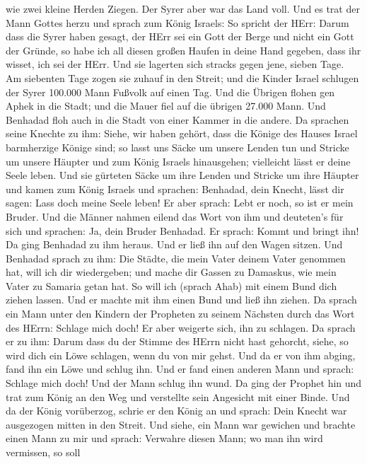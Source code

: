 wie zwei kleine Herden Ziegen. Der Syrer aber war das Land voll.
 Und es trat der Mann Gottes herzu und sprach zum König
Israels: So spricht der HErr: Darum dass die Syrer haben gesagt, der
HErr sei ein Gott der Berge und nicht ein Gott der Gründe, so habe ich
all diesen großen Haufen in deine Hand gegeben, dass ihr wisset, ich sei
der HErr.  Und sie lagerten sich stracks gegen jene, sieben
Tage. Am siebenten Tage zogen sie zuhauf in den Streit; und die Kinder
Israel schlugen der Syrer 100.000 Mann Fußvolk auf einen Tag.
 Und die Übrigen flohen gen Aphek in die Stadt; und die
Mauer fiel auf die übrigen 27.000 Mann. Und Benhadad floh auch in die
Stadt von einer Kammer in die andere.  Da sprachen seine
Knechte zu ihm: Siehe, wir haben gehört, dass die Könige des Hauses
Israel barmherzige Könige sind; so lasst uns Säcke um unsere Lenden tun
und Stricke um unsere Häupter und zum König Israels hinausgehen;
vielleicht lässt er deine Seele leben.  Und sie gürteten
Säcke um ihre Lenden und Stricke um ihre Häupter und kamen zum König
Israels und sprachen: Benhadad, dein Knecht, lässt dir sagen: Lass doch
meine Seele leben! Er aber sprach: Lebt er noch, so ist er mein Bruder.
 Und die Männer nahmen eilend das Wort von ihm und
deuteten's für sich und sprachen: Ja, dein Bruder Benhadad. Er sprach:
Kommt und bringt ihn! Da ging Benhadad zu ihm heraus. Und er ließ ihn
auf den Wagen sitzen.  Und Benhadad sprach zu ihm: Die
Städte, die mein Vater deinem Vater genommen hat, will ich dir
wiedergeben; und mache dir Gassen zu Damaskus, wie mein Vater zu Samaria
getan hat. So will ich (sprach Ahab) mit einem Bund dich ziehen lassen.
Und er machte mit ihm einen Bund und ließ ihn ziehen.  Da
sprach ein Mann unter den Kindern der Propheten zu seinem Nächsten durch
das Wort des HErrn: Schlage mich doch! Er aber weigerte sich, ihn zu
schlagen.  Da sprach er zu ihm: Darum dass du der Stimme
des HErrn nicht hast gehorcht, siehe, so wird dich ein Löwe schlagen,
wenn du von mir gehst. Und da er von ihm abging, fand ihn ein Löwe und
schlug ihn.  Und er fand einen anderen Mann und sprach:
Schlage mich doch! Und der Mann schlug ihn wund.  Da ging
der Prophet hin und trat zum König an den Weg und verstellte sein
Angesicht mit einer Binde.  Und da der König vorüberzog,
schrie er den König an und sprach: Dein Knecht war ausgezogen mitten in
den Streit. Und siehe, ein Mann war gewichen und brachte einen Mann zu
mir und sprach: Verwahre diesen Mann; wo man ihn wird vermissen, so soll

